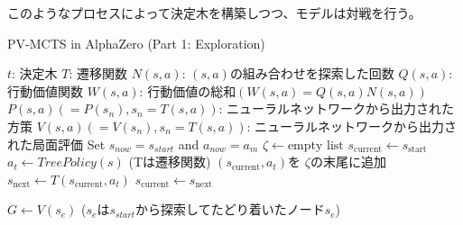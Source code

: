 	
このようなプロセスによって決定木を構築しつつ、モデルは対戦を行う。
\newpage
\begin{algorithm}
    \caption{PV-MCTS in AlphaZero (Part 1: Exploration)}
    \label{alg:mcts-1}
    \begin{algorithmic}[1]
        \State $t$: 決定木
        \State $T$: 遷移関数
        \State $N(s, a)$: $(s, a)$の組み合わせを探索した回数
        \State $Q(s, a)$: 行動価値関数 
        \State $W(s, a)$: 行動価値の総和$(W(s, a)=Q(s, a)N(s, a))$
        \State $P(s, a)(=P(s_n), s_n=T(s, a))$: 
        \State ニューラルネットワークから出力された方策
        \State $V(s, a)(=V(s_n), s_n=T(s, a))$: 
        \State ニューラルネットワークから出力された局面評価
            \State Set $s_{now} = s_{start}$ and $a_{now} = a_m$
                \State $\zeta \gets \textrm{empty list}$
                \State $s_{\text{current}} \gets s_{\text{start}}$
                    \State $a_t \gets TreePolicy(s)$
                    \State (Tは遷移関数)
                    \State $(s_{\text{current}}, a_t)$を $\zeta $の末尾に追加
                    \State $s_{\text{next}} \gets T(s_{\text{current}}, a_t)$
                    \State $s_{\text{current}} \gets s_{\text{next}}$
                    
                \EndWhile
                \State $G \gets V(s_e)$ 
                \State($s_e$は$s_{start}$から探索してたどり着いたノード$s_e$)
                \State {}
            \EndFor
        \EndFunction
        
        
    \end{algorithmic}
\end{algorithm}

